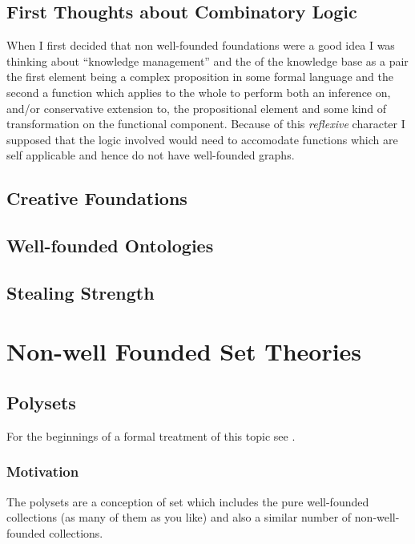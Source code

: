 \documentclass{article}
\begin{document}
\begin{article}
\subsection{First Thoughts about Combinatory Logic}

When I first decided that non well-founded foundations were a good idea I was thinking about ``knowledge management'' and the of the knowledge base as a pair the first element being a complex proposition in some formal language and the second a function which applies to the whole to perform both an inference on, and/or conservative extension to, the propositional element and some kind of transformation on the functional component.
Because of this \emph{reflexive} character I supposed that the logic involved would need to accomodate functions which are self applicable and hence do not have well-founded graphs.


\subsection{Creative Foundations}

\subsection{Well-founded Ontologies}



\subsection{Stealing Strength}

\section{Non-well Founded Set Theories}


\subsection{Polysets}

For the beginnings of a formal treatment of this topic see \cite{rbjt020}.

\subsubsection{Motivation}

The polysets are a conception of set which includes the pure well-founded collections (as many of them as you like) and also a similar number of non-well-founded collections.


\end{article}
\end{document}
